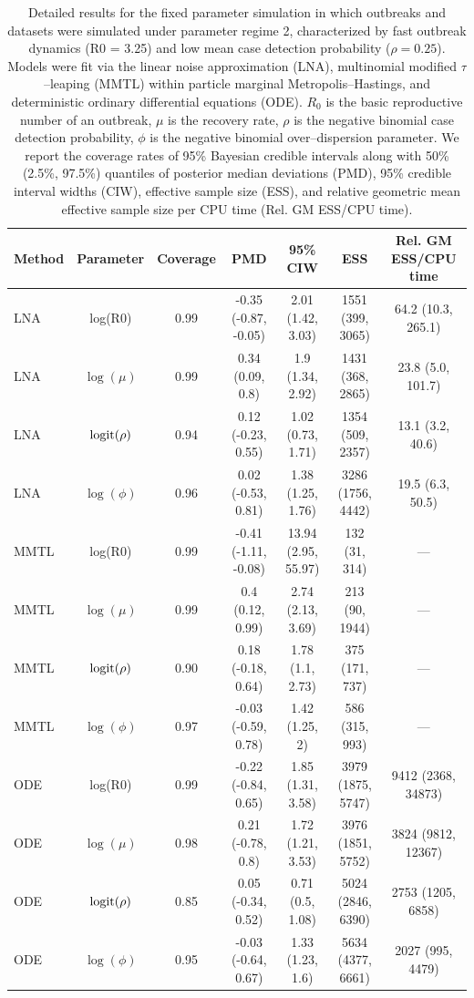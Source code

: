 \begin{table}
	\begin{fullpage}
		\small
		\centering
		\begin{tabular}{lcccccc}
			\hline
			\textbf{Method} & \textbf{Parameter} & \textbf{Coverage} & \textbf{PMD} & \textbf{95\% CIW} & \textbf{ESS} & \textbf{Rel. GM ESS/CPU time} \\ 
			\hline
			LNA & log(R0) & 0.99 & -0.35 (-0.87, -0.05) & 2.01 (1.42, 3.03) & 1551 (399, 3065) & 64.2 (10.3, 265.1) \\ 
			LNA & $\log(\mu)$ & 0.99 & 0.34 (0.09, 0.8) & 1.9 (1.34, 2.92) & 1431 (368, 2865) & 23.8 (5.0, 101.7) \\ 
			LNA & $\mathrm{logit}(\rho)$ & 0.94 & 0.12 (-0.23, 0.55) & 1.02 (0.73, 1.71) & 1354 (509, 2357) & 13.1 (3.2, 40.6) \\ 
			LNA & $\log(\phi)$ & 0.96 & 0.02 (-0.53, 0.81) & 1.38 (1.25, 1.76) & 3286 (1756, 4442) & 19.5 (6.3, 50.5) \\ 
			MMTL & log(R0) & 0.99 & -0.41 (-1.11, -0.08) & 13.94 (2.95, 55.97) & 132 (31, 314) & --- \\ 
			MMTL & $\log(\mu)$ & 0.99 & 0.4 (0.12, 0.99) & 2.74 (2.13, 3.69) & 213 (90, 1944) & --- \\ 
			MMTL & $\mathrm{logit}(\rho)$ & 0.90 & 0.18 (-0.18, 0.64) & 1.78 (1.1, 2.73) & 375 (171, 737) & --- \\ 
			MMTL & $\log(\phi)$ & 0.97 & -0.03 (-0.59, 0.78) & 1.42 (1.25, 2) & 586 (315, 993) & --- \\ 
			ODE & log(R0) & 0.99 & -0.22 (-0.84, 0.65) & 1.85 (1.31, 3.58) & 3979 (1875, 5747) & 9412 (2368, 34873) \\ 
			ODE & $\log(\mu)$ & 0.98 & 0.21 (-0.78, 0.8) & 1.72 (1.21, 3.53) & 3976 (1851, 5752) & 3824 (9812, 12367) \\ 
			ODE & $\mathrm{logit}(\rho)$ & 0.85 & 0.05 (-0.34, 0.52) & 0.71 (0.5, 1.08) & 5024 (2846, 6390) & 2753 (1205, 6858) \\ 
			ODE & $\log(\phi)$ & 0.95 & -0.03 (-0.64, 0.67) & 1.33 (1.23, 1.6) & 5634 (4377, 6661) & 2027 (995, 4479) \\ 
			\hline
		\end{tabular}
		\caption[Fast dynamics, low detection probability regime fixed parameter coverage simulation results.]{Detailed results for the fixed parameter  simulation in which outbreaks and datasets were simulated under parameter regime 2, characterized by fast outbreak dynamics (R0 = 3.25) and low mean case detection probability ($ \rho = 0.25 $). Models were fit via the linear noise approximation (LNA), multinomial modified $ \tau $--leaping (MMTL) within particle marginal Metropolis--Hastings, and deterministic ordinary differential equations (ODE). $ R_0 $ is the basic reproductive number of an outbreak, $ \mu $ is the recovery rate, $ \rho $ is the negative binomial case detection probability, $ \phi $ is the negative binomial over--dispersion parameter. We report the coverage rates of 95\% Bayesian credible intervals along with 50\% (2.5\%, 97.5\%) quantiles of posterior median deviations (PMD), 95\% credible interval widths (CIW), effective sample size (ESS), and relative geometric mean effective sample size per CPU time (Rel. GM ESS/CPU time).}

\end{fullpage}
\end{table}

